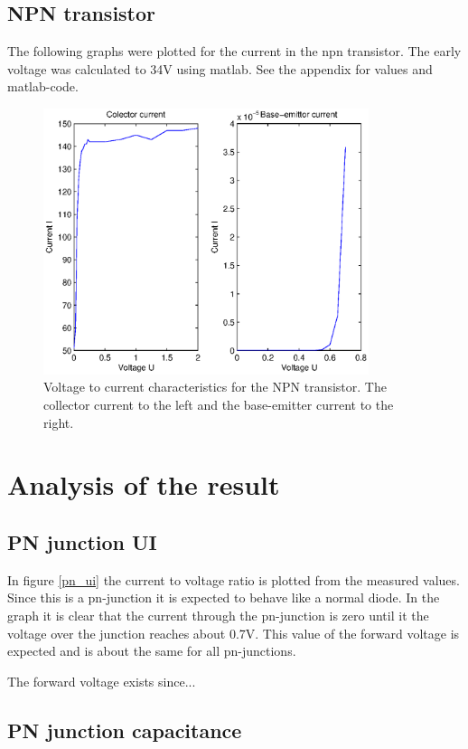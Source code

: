 \documentclass[a4paper]{article}
\begin{document}
\subsection{NPN transistor}
The following graphs were plotted for the current in the npn transistor. The early voltage was calculated to 34V using matlab. See the appendix for values and matlab-code.
\begin{figure}[H]
	\centering
	\includegraphics[width=0.85\textwidth]{npn.eps}
	\caption{Voltage to current characteristics for the NPN transistor. The collector current to the left and the base-emitter current to the right.}	
	\label{npn}
\end{figure}

\newpage
\section{Analysis of the result}
\subsection{PN junction UI}
In figure \ref{pn_ui} the current to voltage ratio is plotted from the measured values. Since this is a pn-junction it is expected to behave like a normal diode. In the graph it is clear that the current through the pn-junction is zero until it the voltage over the junction reaches about 0.7V. This value of the forward voltage is expected and is about the same for all pn-junctions.

The forward voltage exists since...

\subsection{PN junction capacitance}
\end{document}
